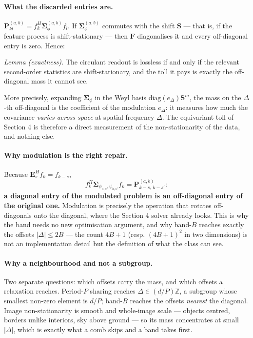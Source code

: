 \paragraph{What the discarded entries are.} $\boldsymbol{P}^{(a,b)}_{kl}=f^{H}_{k}\boldsymbol{\Sigma}^{(a,b)}_{\phi}f_{l}$.
If $\boldsymbol{\Sigma}^{(a,b)}_{\phi}$ commutes with the shift $\boldsymbol{S}$ --- that
is, if the feature process is shift-stationary --- then $\boldsymbol{F}$ diagonalises it
and every off-diagonal entry is zero. Hence:

\emph{Lemma (exactness).} The circulant readout is lossless if and only if the relevant
second-order statistics are shift-stationary, and the toll it pays is exactly the
off-diagonal mass it cannot see.

More precisely, expanding $\boldsymbol{\Sigma}_{\phi}$ in the Weyl basis
$\text{diag}(e_{\Delta})\boldsymbol{S}^{m}$, the mass on the $\Delta$-th off-diagonal is
the coefficient of the modulation $e_{\Delta}$: it measures how much the covariance
\emph{varies across space} at spatial frequency $\Delta$. The equivariant toll of
Section 4 is therefore a direct measurement of the non-stationarity of the data, and
nothing else.

\paragraph{Why modulation is the right repair.} Because $\boldsymbol{E}^{H}_{s}f_{k}=f_{k-s}$,
\[
f^{H}_{k}\boldsymbol{\Sigma}_{\psi_{a,s},\psi_{b,s'}}f_{k}=\boldsymbol{P}^{(a,b)}_{k-s,\,k-s'} :
\]
\textbf{a diagonal entry of the modulated problem is an off-diagonal entry of the
original one.} Modulation is precisely the operation that rotates off-diagonals onto the
diagonal, where the Section 4 solver already looks. This is why the band needs no new
optimisation argument, and why band-$B$ reaches exactly the offsets $|\Delta|\le 2B$ ---
the count $4B+1$ (resp. $(4B+1)^{2}$ in two dimensions) is not an implementation detail
but the definition of what the class can see.

\paragraph{Why a neighbourhood and not a subgroup.} Two separate questions: which
offsets carry the mass, and which offsets a relaxation reaches. Period-$P$ sharing
reaches $\Delta\in(d/P)\mathbb{Z}$, a subgroup whose smallest non-zero element is $d/P$;
band-$B$ reaches the offsets \emph{nearest} the diagonal. Image non-stationarity is
smooth and whole-image scale --- objects centred, borders unlike interiors, sky above
ground --- so its mass concentrates at small $|\Delta|$, which is exactly what a comb
skips and a band takes first.

